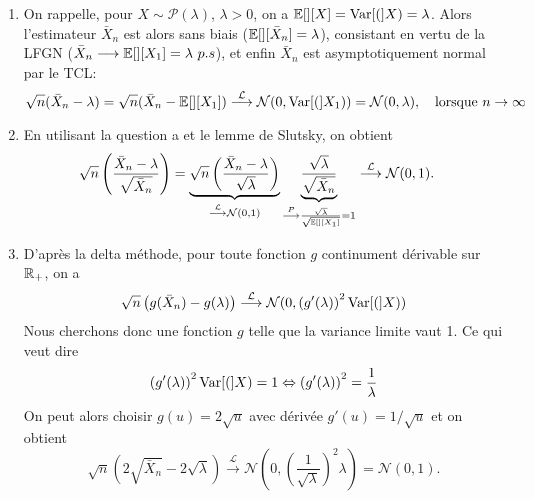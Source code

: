 \begin{solution}
  \begin{enumerate}
    \item On rappelle, pour $X\sim\mathcal P(\lambda)$, $\lambda>0$, on a
          $\mathbb{E}[][X]=\operatorname{Var}[(]X)=\lambda$. Alors l'estimateur $\bar X_n$ est alors sans
          biais ($\mathbb{E}[][\bar X_n] =\lambda$), consistant en vertu de la LFGN
          ($\bar X_n\longrightarrow \mathbb{E}[][X_1]=\lambda~p.s$), et enfin $\bar{X}_n$
          est asymptotiquement normal par le TCL:
          \[
            \sqrt n( \bar{X}
            _n-\lambda)=\sqrt n( \bar X_n-\mathbb{E}[][X_1])\stackrel{\mathcal
              L}\longrightarrow\mathcal N(0,\operatorname{Var}[(]X_1))=\mathcal
            N(0,\lambda),\quad\text{lorsque }n\to\infty
          \]

    \item En utilisant la question a et le lemme de Slutsky, on obtient
          \begin{align*}
            \sqrt n \left(\frac{\bar X_n-\lambda}{\sqrt{\bar X_n}} \right)
             & = \underbrace{ \sqrt n \left(\frac{\bar X_n-\lambda}{\sqrt{\lambda}} \right) }_{\stackrel{\mathcal L}\longrightarrow\mathcal N(0,1)} \underbrace{\frac{\sqrt{\lambda}}{\sqrt{\bar X_n}}}_{\stackrel{P}\longrightarrow \frac{\sqrt{\lambda}}{\sqrt{\mathbb{E}[][X_1]}}=1}
            \stackrel{\mathcal L}\longrightarrow\mathcal N(0,1).
          \end{align*}
    \item D'apr\`es la delta m\'ethode, pour toute fonction $g$ continument d\'erivable
          sur $\mathbb{R}_+$, on a
          \[
            \sqrt n \left(g(\bar X_n)-g(\lambda)
            \right)\stackrel{\mathcal L}\longrightarrow\mathcal
            N(0,{(g'(\lambda))}^2\operatorname{Var}[(]X))
          \]
          Nous cherchons donc une fonction $g$ telle que la variance limite vaut 1. Ce
          qui veut dire
          \[
            {(g'(\lambda))}^2\operatorname{Var}[(]X)=1
            \Leftrightarrow {(g'(\lambda))}^2 = \frac1\lambda
          \]
          On peut alors choisir $g(u) = 2\sqrt u$ avec d\'eriv\'ee $g'(u)= 1/\sqrt u$ et
          on obtient
          \[
            \sqrt n
            \left(2\sqrt{\bar X_n}-2\sqrt \lambda \right)\stackrel{\mathcal
              L}\longrightarrow\mathcal
            N\left(0,{\left(\frac1{\sqrt\lambda}\right)}^2\lambda\right)=\mathcal N(0,1).
          \]

  \end{enumerate}

\end{solution}


